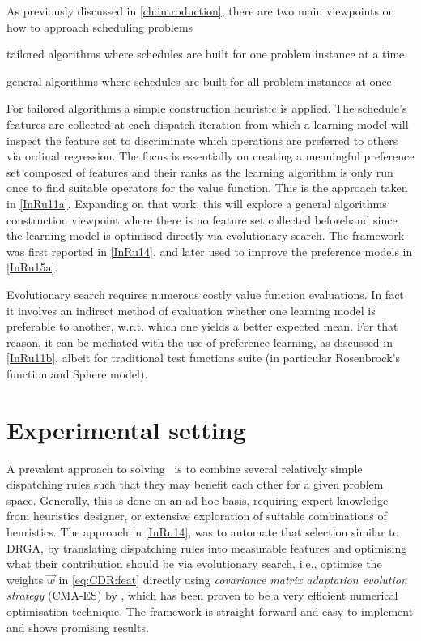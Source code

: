 As previously discussed in \cref{ch:introduction}, there are two main 
viewpoints on how to approach scheduling problems
\begin{enumerate*}
    \item tailored algorithms where schedules are built for one problem 
    instance at a time
    \item general algorithms where schedules are built for all problem 
    instances at once
\end{enumerate*}
For tailored algorithms a simple construction heuristic is applied. The 
schedule's features are collected at each dispatch iteration from which a 
learning model will inspect the feature set to discriminate which operations 
are preferred to others via ordinal regression. The focus is essentially on 
creating a meaningful preference set composed of features and their ranks as 
the learning algorithm is only run once to find suitable operators for the 
value function. This is the approach taken in \cref{InRu11a}. Expanding on 
that  work, this  will explore a general algorithms 
construction viewpoint where there is no feature set collected beforehand since 
the learning model is optimised directly via evolutionary search. The framework 
was first reported in \cref{InRu14}, and later used to improve the preference 
models in \cref{InRu15a}. 

Evolutionary search requires numerous costly value function evaluations. 
In fact it involves an indirect method of evaluation whether one learning model 
is preferable to another, w.r.t. which one yields a better expected mean. For 
that reason, it can be mediated with the use of preference learning, as 
discussed in \cref{InRu11b}, albeit for traditional test functions suite (in 
particular Rosenbrock's function and Sphere model).

\section{Experimental setting}
A prevalent approach to solving \JSP\ is to combine several relatively simple 
dispatching rules such that they may benefit each other for a given problem 
space. Generally, this is done on an ad hoc basis, requiring expert knowledge 
from heuristics designer, or extensive exploration of suitable combinations of 
heuristics. The approach in \cref{InRu14}, was to automate that selection 
similar to DRGA, by translating dispatching rules into measurable features and 
optimising what their contribution should be via evolutionary search, i.e., 
optimise the weights $\vec{w}$ in \cref{eq:CDR:feat} directly using
\emph{covariance matrix adaptation evolution strategy} (CMA-ES) by 
\cite{Hansen01}, which has been proven to be a very efficient numerical 
optimisation technique. 
The framework is straight forward and easy to implement and shows promising 
results. 


